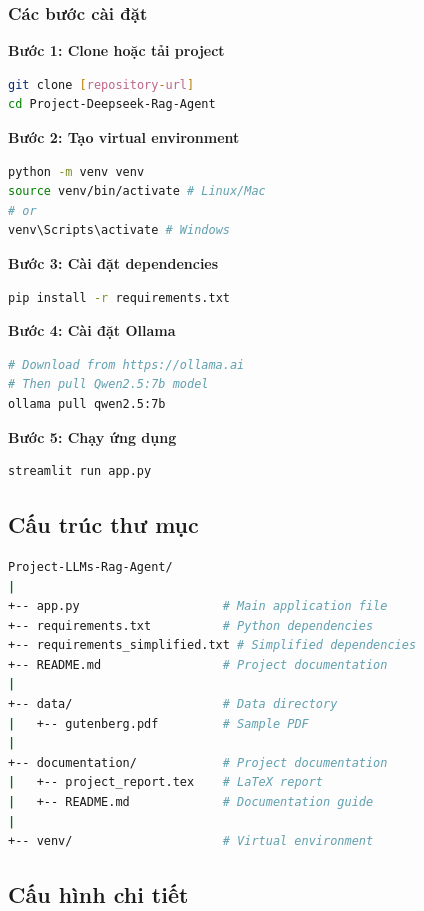 \documentclass[a4paper]{article}
\begin{document}
\subsubsection{Các bước cài đặt} %
\textbf{Bước 1: Clone hoặc tải project}
\begin{lstlisting}[language=bash]
git clone [repository-url]
cd Project-Deepseek-Rag-Agent
\end{lstlisting}

\textbf{Bước 2: Tạo virtual environment}
\begin{lstlisting}[language=bash]
python -m venv venv
source venv/bin/activate # Linux/Mac
# or
venv\Scripts\activate # Windows
\end{lstlisting}

\textbf{Bước 3: Cài đặt dependencies}
\begin{lstlisting}[language=bash]
pip install -r requirements.txt
\end{lstlisting} %

\textbf{Bước 4: Cài đặt Ollama}
\begin{lstlisting}[language=bash]
# Download from https://ollama.ai
# Then pull Qwen2.5:7b model
ollama pull qwen2.5:7b
\end{lstlisting}

\textbf{Bước 5: Chạy ứng dụng}
\begin{lstlisting}[language=bash]
streamlit run app.py
\end{lstlisting} %

\subsection{Cấu trúc thư mục}
\begin{lstlisting}[language=bash, caption=Cau truc thu muc]
Project-LLMs-Rag-Agent/
|
+-- app.py                    # Main application file
+-- requirements.txt          # Python dependencies
+-- requirements_simplified.txt # Simplified dependencies
+-- README.md                 # Project documentation
|
+-- data/                     # Data directory
|   +-- gutenberg.pdf         # Sample PDF
|
+-- documentation/            # Project documentation
|   +-- project_report.tex    # LaTeX report
|   +-- README.md             # Documentation guide
|
+-- venv/                     # Virtual environment
\end{lstlisting}

\subsection{Cấu hình chi tiết} %
\end{document}

